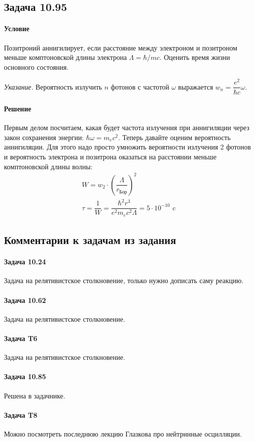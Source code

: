 \documentclass[12pt]{article}
\begin{document}
\subsection{Задача 10.95}
\label{task_10.95}
\paragraph{Условие}
Позитроний аннигилирует, если расстояние между электроном и позитроном меньше комптоновской длины электрона $\Lambda = \hbar/mc$. Оценить время жизни основного состояния.

\textit{Указание.} Вероятность излучить $n$ фотонов с частотой $\omega$ выражается $w_n = \dfrac{e^2}{\hbar c} \omega$.
\paragraph{Решение}
Первым делом посчитаем, какая будет частота излучения при аннигиляции через закон сохранения энергии: $\hbar \omega = m_ec^2$. Теперь давайте оценим вероятность аннигиляции. Для этого надо просто умножить вероятности излучения 2 фотонов и вероятность электрона и позитрона оказаться на расстоянии меньше комптоновской длины волны:
\begin{gather*}
    W = w_2 \cdot \left(\dfrac{\Lambda}{r_{\text{Бор}}}\right)^2\\
    \tau = \dfrac{1}{W} = \dfrac{\hbar^2 r^3}{e^2 m_ec^2 \Lambda} = 5\cdot 10^{-10} \text{ c}
\end{gather*}


\subsection{Комментарии к задачам из задания}
\paragraph{Задача 10.24} Задача на релятивистское столкновение, только нужно дописать саму реакцию.
\paragraph{Задача 10.62}  Задача на релятивистское столкновение.
\paragraph{Задача T6} Задача на релятивистское столкновение.
\paragraph{Задача 10.85} Решена в задачнике.
\paragraph{Задача T8} Можно посмотреть последнюю лекцию Глазкова про нейтринные осцилляции.
\end{document}
